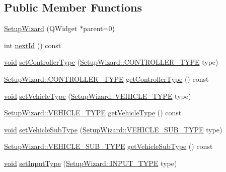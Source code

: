 \subsection*{\-Public \-Member \-Functions}
\begin{DoxyCompactItemize}
\item 
\hyperlink{group___setup_ga8f260c27631b936af1a8e2a9475ae2f0}{\-Setup\-Wizard} (\-Q\-Widget $\ast$parent=0)
\item 
int \hyperlink{group___setup_ga7e04c785013743eebd2ceb833536568d}{next\-Id} () const 
\item 
\hyperlink{group___u_a_v_objects_plugin_ga444cf2ff3f0ecbe028adce838d373f5c}{void} \hyperlink{group___setup_gab45587f98cb648017f85da303efa068c}{set\-Controller\-Type} (\hyperlink{group___vehicle_configuration_source_ga3cfce2b0a501a6fdb7a0ae408ba63556}{\-Setup\-Wizard\-::\-C\-O\-N\-T\-R\-O\-L\-L\-E\-R\-\_\-\-T\-Y\-P\-E} type)
\item 
\hyperlink{group___vehicle_configuration_source_ga3cfce2b0a501a6fdb7a0ae408ba63556}{\-Setup\-Wizard\-::\-C\-O\-N\-T\-R\-O\-L\-L\-E\-R\-\_\-\-T\-Y\-P\-E} \hyperlink{group___setup_ga1d7c4e20ee0857aef644a2e162ce51e7}{get\-Controller\-Type} () const 
\item 
\hyperlink{group___u_a_v_objects_plugin_ga444cf2ff3f0ecbe028adce838d373f5c}{void} \hyperlink{group___setup_gad78d95f5556264d0ceb480487ffadfb8}{set\-Vehicle\-Type} (\hyperlink{group___vehicle_configuration_source_gaa97253587c69ba0d23535abdc42fad43}{\-Setup\-Wizard\-::\-V\-E\-H\-I\-C\-L\-E\-\_\-\-T\-Y\-P\-E} type)
\item 
\hyperlink{group___vehicle_configuration_source_gaa97253587c69ba0d23535abdc42fad43}{\-Setup\-Wizard\-::\-V\-E\-H\-I\-C\-L\-E\-\_\-\-T\-Y\-P\-E} \hyperlink{group___setup_gac67d395a98064dde4cd243f78cdef9d4}{get\-Vehicle\-Type} () const 
\item 
\hyperlink{group___u_a_v_objects_plugin_ga444cf2ff3f0ecbe028adce838d373f5c}{void} \hyperlink{group___setup_gaceb7a4422958869c876dd43842e6960c}{set\-Vehicle\-Sub\-Type} (\hyperlink{group___vehicle_configuration_source_gaa22bfa88d750f2b46f66702a723e8342}{\-Setup\-Wizard\-::\-V\-E\-H\-I\-C\-L\-E\-\_\-\-S\-U\-B\-\_\-\-T\-Y\-P\-E} type)
\item 
\hyperlink{group___vehicle_configuration_source_gaa22bfa88d750f2b46f66702a723e8342}{\-Setup\-Wizard\-::\-V\-E\-H\-I\-C\-L\-E\-\_\-\-S\-U\-B\-\_\-\-T\-Y\-P\-E} \hyperlink{group___setup_ga4ad46c232d39b8e7a4371a812c48e761}{get\-Vehicle\-Sub\-Type} () const 
\item 
\hyperlink{group___u_a_v_objects_plugin_ga444cf2ff3f0ecbe028adce838d373f5c}{void} \hyperlink{group___setup_gaad34b14bbd332f721c9bca49fc43bf33}{set\-Input\-Type} (\hyperlink{group___vehicle_configuration_source_gae10edd59d3a32fad8c531a1d2346115c}{\-Setup\-Wizard\-::\-I\-N\-P\-U\-T\-\_\-\-T\-Y\-P\-E} type)

\end{DoxyCompactItemize}
